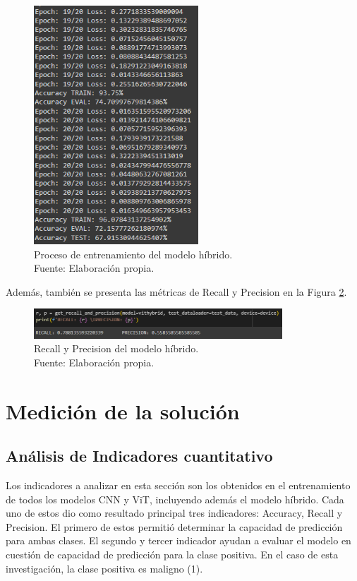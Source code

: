 \begin{figure}[H]
	\begin{center}
		\includegraphics[width=0.55\textwidth]{4/figures/modelH_train.PNG}
		\caption[Proceso de entrenamiento del modelo híbrido]{Proceso de entrenamiento del modelo híbrido. \\
		Fuente: Elaboración propia.}
		\label{4:fig168}
	\end{center}
\end{figure}

Además, también se presenta las métricas de Recall y Precision en la Figura \ref{4:fig169}.

\begin{figure}[H]
	\begin{center}
		\includegraphics[width=0.83\textwidth]{4/figures/modelH_rp.PNG}
		\caption[Recall y Precision del modelo híbrido]{Recall y Precision del modelo híbrido. \\
		Fuente: Elaboración propia.}
		\label{4:fig169}
	\end{center}
\end{figure}

\section{Medición de la solución}

\subsection{Análisis de Indicadores cuantitativo}
Los indicadores a analizar en esta sección son los obtenidos en el entrenamiento de todos los modelos CNN y ViT, incluyendo además el modelo híbrido. Cada uno de estos dio como resultado principal tres indicadores: Accuracy, Recall y Precision. El primero de estos permitió determinar la capacidad de predicción para ambas clases. El segundo y tercer indicador ayudan a evaluar el modelo en cuestión de capacidad de predicción para la clase positiva. En el caso de esta investigación, la clase positiva es maligno (1).

